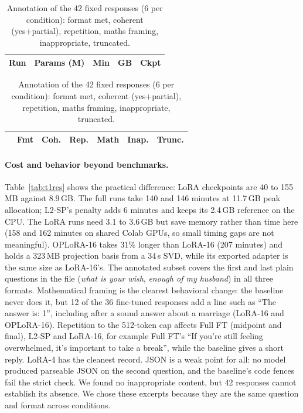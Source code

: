 \documentclass{article}
\begin{document}
\begin{table}[t]
\centering\footnotesize
\begin{minipage}{0.46\linewidth}\centering
\caption{Resources for the five runs. Times and memory on a T4; checkpoint is the final recovery state.}
\label{tab:t1res}
\begin{tabular}{lcccc}
\toprule
Run & Params (M) & Min & GB & Ckpt \\
\midrule

\bottomrule
\end{tabular}
\end{minipage}\hfill
\begin{minipage}{0.51\linewidth}\centering
\caption{Annotation of the 42 fixed responses (6 per condition): format met, coherent (yes+partial), repetition, maths framing, inappropriate, truncated.}
\label{tab:t1ann}
\begin{tabular}{lcccccc}
\toprule
 & Fmt & Coh. & Rep. & Math & Inap. & Trunc. \\
\midrule

\bottomrule
\end{tabular}
\end{minipage}
\end{table}

\paragraph{Cost and behavior beyond benchmarks.} Table~\ref{tab:t1res} shows the practical difference: LoRA checkpoints are 40 to 155\,MB against 8.9\,GB. The full runs take 140 and 146 minutes at 11.7\,GB peak allocation; L2-SP's penalty adds 6 minutes and keeps its 2.4\,GB reference on the CPU. The LoRA runs need 3.1 to 3.6\,GB but save memory rather than time here (158 and 162 minutes on shared Colab GPUs, so small timing gaps are not meaningful). OPLoRA-16 takes 31\% longer than LoRA-16 (207 minutes) and holds a 323\,MB projection basis from a 34\,s SVD, while its exported adapter is the same size as LoRA-16's. The annotated subset covers the first and last plain questions in the file (\emph{what is your wish}, \emph{enough of my husband}) in all three formats. Mathematical framing is the clearest behavioral change: the baseline never does it, but 12 of the 36 fine-tuned responses add a line such as ``The answer is: 1'', including after a sound answer about a marriage (LoRA-16 and OPLoRA-16). Repetition to the 512-token cap affects Full FT (midpoint and final), L2-SP and LoRA-16, for example Full FT's ``If you're still feeling overwhelmed, it's important to take a break'', while the baseline gives a short reply. LoRA-4 has the cleanest record. JSON is a weak point for all: no model produced parseable JSON on the second question, and the baseline's code fences fail the strict check. We found no inappropriate content, but 42 responses cannot establish its absence. We chose these excerpts because they are the same question and format across conditions.
\end{document}
